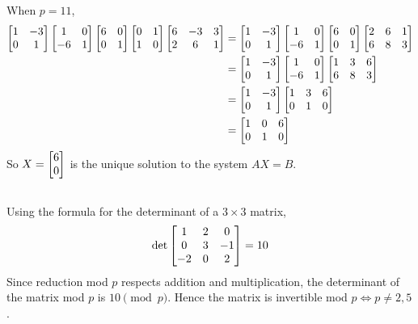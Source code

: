 \documentclass[12pt]{article}
\begin{document}
When $p = 11$, 
\begin{align*}
  \begin{bmatrix}1 & -3 \\ 0 & 1\end{bmatrix} \begin{bmatrix}1 & 0 \\ -6 & 1\end{bmatrix} \begin{bmatrix}6 & 0 \\ 0 & 1\end{bmatrix} \begin{bmatrix}0 & 1 \\ 1 & 0\end{bmatrix} \begin{bmatrix}6 & -3 & 3 \\ 2 & 6 & 1\end{bmatrix} & = \begin{bmatrix}1 & -3 \\ 0 & 1\end{bmatrix} \begin{bmatrix}1 & 0 \\ -6 & 1\end{bmatrix} \begin{bmatrix}6 & 0 \\ 0 & 1\end{bmatrix} \begin{bmatrix}2 & 6 & 1 \\ 6 & 8 & 3\end{bmatrix} \\ 
          & = \begin{bmatrix}1 & -3 \\ 0 & 1\end{bmatrix} \begin{bmatrix}1 & 0 \\ -6 & 1\end{bmatrix} \begin{bmatrix}1 & 3 & 6 \\ 6 & 8 & 3\end{bmatrix} \\ 
          & = \begin{bmatrix}1 & -3 \\ 0 & 1\end{bmatrix} \begin{bmatrix}1 & 3 & 6 \\ 0 & 1 & 0\end{bmatrix} \\ 
          & = \begin{bmatrix}1 & 0 & 6 \\ 0 & 1 & 0\end{bmatrix} 
\end{align*}
So $X = \begin{bmatrix}6 \\ 0\end{bmatrix}$ is the unique solution to the system $AX = B$. 

\subsection{}
Using the formula for the determinant of a $3 \times 3$ matrix, 
$$\det{\begin{bmatrix}1 & 2 & 0 \\ 0 & 3 & -1 \\ -2 & 0 & 2\end{bmatrix}} = 10$$ 
Since reduction mod $p$ respects addition and multiplication, the determinant of the matrix mod $p$ is $10 \pmod{p}$. 
Hence the matrix is invertible mod $p \iff p \neq 2, 5$. 
\end{document}
